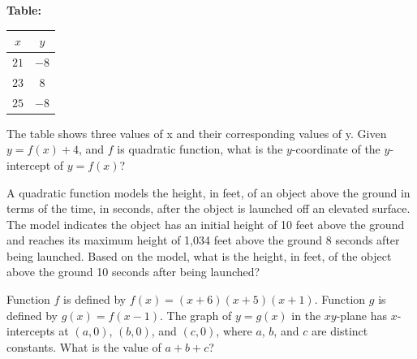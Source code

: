 \vspace{0.75em}


\vspace{2em}

\noindent\markforreview
\vspace{1em}

\textbf{Table:}
\begin{center}
\begin{tabular}{|c|c|}
\hline
$x$ & $y$ \\
\hline
$21$ & $-8$ \\
$23$ & $8$ \\
$25$ & $-8$ \\
\hline
\end{tabular}
\end{center}

The table shows three values of x and their corresponding values of y. Given $y = f(x) + 4$, and $f$ is quadratic function, what is the $y$-coordinate of the $y$-intercept of $y = f(x)$?

\newpage

\noindent\markforreview
\vspace{1em}

A quadratic function models the height, in feet, of an object above the ground in terms of the time, in seconds, after the object is launched off an elevated surface. The model indicates the object has an initial height of 10 feet above the ground and reaches its maximum height of 1,034 feet above the ground 8 seconds after being launched. Based on the model, what is the height, in feet, of the object above the ground 10 seconds after being launched?

\vspace{0.75em}


\vspace{2em}

\noindent\markforreview
\vspace{1em}

Function $f$ is defined by $f(x) = (x + 6)(x + 5)(x + 1)$.  
Function $g$ is defined by $g(x) = f(x - 1)$.  
The graph of $y = g(x)$ in the $xy$-plane has $x$-intercepts at $(a, 0)$, $(b, 0)$, and $(c, 0)$, where $a$, $b$, and $c$ are distinct constants.  
What is the value of $a + b + c$?

